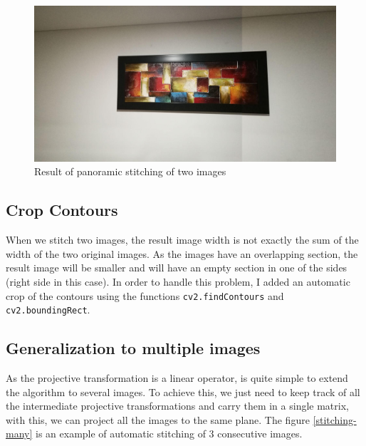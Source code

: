 \documentclass[journal]{IEEEtran}
\begin{document}
\begin{figure}
  \includegraphics[scale=0.13]{../img/stitch0}
  \caption{Result of panoramic stitching of two images}
  \label{stitching-result}
\end{figure}

\subsection{Crop Contours}

When we stitch two images, the result image width is not exactly the sum of the
width of the two original images. As the images have an overlapping section, the
result image will be smaller and will have an empty section in one of the sides
(right side in this case). In order to handle this problem, I added an automatic
crop of the contours using the functions \verb!cv2.findContours! and
\verb!cv2.boundingRect!.

\subsection{Generalization to multiple images}

As the projective transformation is a linear operator, is quite simple to extend
the algorithm to several images. To achieve this, we just need to keep track
of all the intermediate projective transformations and carry them in a single
matrix, with this, we can project all the images to the same plane. The figure
\ref{stitching-many} is an example of automatic stitching of 3 consecutive
images.

\end{document}
